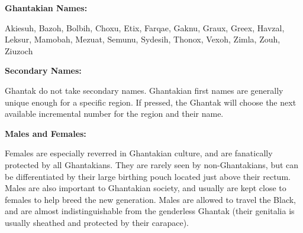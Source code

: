 \textbf{Ghantakian Names:}

Akiesuh, Bazoh, Bolbih, Choxu, Etix, Farqae, Gaknu, Graux, Greex, Havzal, Leksur, Mamobah, Mezuat, Semunu, Sydesih, Thonox, Vexoh, Zimla, Zouh, Ziuzoch

\textbf{Secondary Names:}

Ghantak do not take secondary names. Ghantakian first names are generally unique enough for a specific region. If pressed, the Ghantak will choose the next available incremental number for the region and their name.

\textbf{Males and Females:}

Females are especially reverred in Ghantakian culture, and are fanatically protected by all Ghantakians. They are rarely seen by non-Ghantakians, but can be differentiated by their large birthing pouch located just above their rectum. Males are also important to Ghantakian society, and usually are kept close to females to help breed the new generation. Males are allowed to travel the Black, and are almost indistinguishable from the genderless Ghantak (their genitalia is usually sheathed and protected by their carapace).
